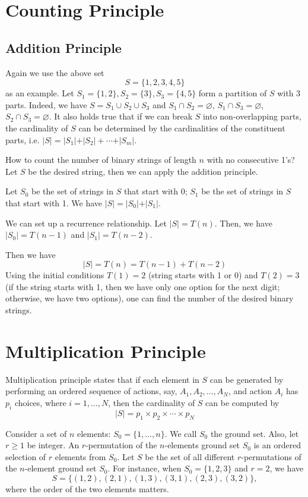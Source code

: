 \section{Counting Principle}
\subsection{Addition Principle}
Again we use the above set 
\[
    S = \{1, 2, 3, 4, 5\}
\]
as an example. Let \(S_1 = \{1, 2\}, S_2 = \{3\}, S_3 = \{4, 5\}\) form a partition of \(S\) with 3 parts. Indeed, we have \(S = S_1 \cup S_2 \cup S_3\) and \(S_1 \cap S_2 = \varnothing\), \(S_1 \cap S_3 = \varnothing\), \(S_2 \cap S_3 = \varnothing\).
It also holds true that if we can break \(S\) into non-overlapping parts, the cardinality of \(S\) can be determined by the cardinalities of the constituent parts, i.e. \(\vert S \vert = \vert S_1 \vert + \vert S_2 \vert + \cdots + \vert S_m \vert \).

\begin{eg}
    How to count the number of binary strings of length \(n\) with no consecutive 1's? Let \(S\) be the desired string, then we can apply the addition principle.

    Let \(S_0\) be the set of strings in \(S\) that start with 0; \(S_1\) be the set of strings in \(S\) that start with 1. We have \(\vert S \vert = \vert S_0 \vert + \vert S_1 \vert\).

    We can set up a recurrence relationship. Let \(\vert S \vert = T(n)\). Then, we have \(\vert S_0 \vert = T(n - 1)\) and \(\vert S_1 \vert = T(n - 2)\).

    Then we have 
    \[
        \vert S \vert = T(n) = T(n - 1) + T(n - 2)
    \]
    Using the initial conditions \(T(1) = 2\) (string starts with 1 or 0) and \(T(2) = 3\) (if the string starts with 1, then we have only one option for the next digit; otherwise, we have two options), one can find the number of the desired binary strings. 
\end{eg}

\section{Multiplication Principle}
Multiplication principle states that if each element in \(S\) can be generated by performing an ordered sequence of actions, say, \(A_1, A_2, \dots, A_N\), and action \(A_i\) has \(p_i\) choices, where \(i = 1, \dots, N\), then the cardinality of \(S\) can be computed by
\[
    \vert S \vert = p_1 \times p_2 \times \cdots \times p_N
\] 
\begin{eg}
    Consider a set of \(n\) elements: \(S_0 = \{1, \dots, n\}\). We call \(S_0\) the ground set. Also, let \(r \geq 1\) be integer. An \(r\)-permutation of the \(n\)-elements ground set \(S_0\) is an ordered selection of \(r\) elements from \(S_0\). Let \(S\) be the set of all different \(r\)-permutations of the \(n\)-element ground set \(S_0\). For instance, when \(S_0 = \{1, 2, 3\}\) and \(r = 2\), we have
    \[
        S = \{(1, 2), (2, 1), (1, 3), (3, 1), (2, 3), (3, 2)\},
    \]
    where the order of the two elements matters. 
\end{eg}

